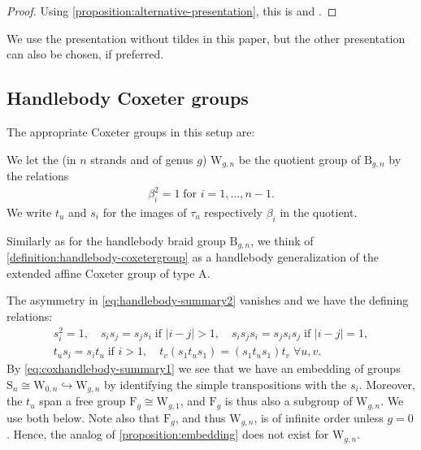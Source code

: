 \documentclass[a4paper,11pt]{amsart}
\let\emph\relax
\renewcommand{\dots}{\text{...}}
\newcommand{\setstuff}[1]{\mathrm{#1}}
\numberwithin{equation}{section}
\let\fullref\autoref
\begin{document}
\begin{proof}
Using \fullref{proposition:alternative-presentation}, this is 
\cite[Theorem 1]{Ve-handlebodies}
and \cite[Section 5]{La-handlebodies}.
\end{proof}

We use the presentation without tildes in this paper, but 
the other presentation can also be chosen, if preferred.

\subsection{Handlebody Coxeter groups}\label{subsection:coxdia}

The appropriate Coxeter groups in this setup are:

\begin{definition}\label{definition:handlebody-coxetergroup}
We let the \emph{handlebody Coxeter group} (in $n$ strands and of genus $g$)
$\setstuff{W}_{g,n}$ be the quotient group of 
$\setstuff{B}_{g,n}$ by the relations
\begin{gather*}
\beta_{i}^{2}=1
\;\text{for }i=1,\dots,n-1.
\end{gather*}
We write $t_{u}$ and $s_{i}$ for the images of 
$\tau_{u}$ respectively $\beta_{i}$ in the quotient.
\end{definition}

Similarly as for the handlebody braid group $\setstuff{B}_{g,n}$, we think of \fullref{definition:handlebody-coxetergroup} as a 
handlebody generalization of the extended affine Coxeter group of type A.

The asymmetry in \eqref{eq:handlebody-summary2} 
vanishes and we have the defining relations:
\begin{gather}
\label{eq:coxhandlebody-summary1}
s_{i}^{2}=1
,\quad
s_{i}s_{j}=s_{j}s_{i}\;\text{if }|i-j|>1,
\quad
s_{i}s_{j}s_{i}=s_{j}s_{i}s_{j}\;\text{if }|i-j|=1,
\\
\label{eq:coxhandlebody-summary2}
t_{u}s_{i}
=s_{i}t_{u}\;\text{if }i>1,
\quad
t_{v}(s_{1}t_{u}s_{1})
=(s_{1}t_{u}s_{1})t_{v}
\;\forall
u,v
.
\end{gather}
By \eqref{eq:coxhandlebody-summary1}
we see that 
we have an embedding of groups $\setstuff{S}_{n}\cong\setstuff{W}_{0,n}\hookrightarrow\setstuff{W}_{g,n}$
by identifying the simple transpositions with the $s_{i}$.
Moreover, the $t_{u}$ span a free group $\setstuff{F}_{g}\cong\setstuff{W}_{g,1}$, 
and $\setstuff{F}_{g}$ is thus also a subgroup of $\setstuff{W}_{g,n}$. 
We use both below. 
Note also that $\setstuff{F}_{g}$, and thus $\setstuff{W}_{g,n}$, 
is of infinite order unless $g=0$. 
Hence, the analog of \fullref{proposition:embedding} 
does not exist for $\setstuff{W}_{g,n}$. 
\end{document}
